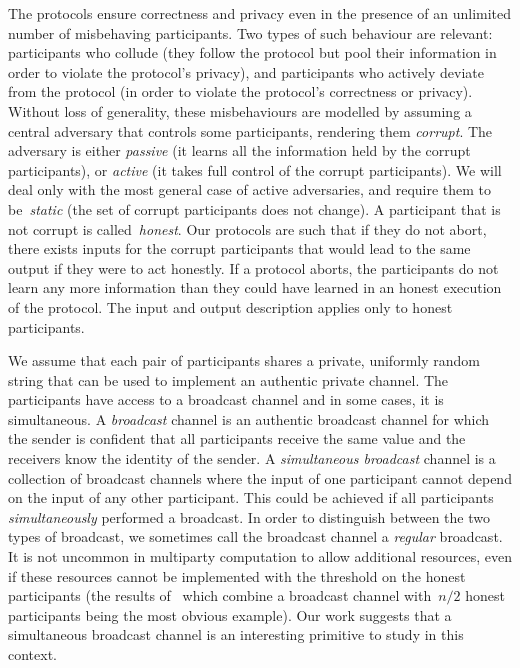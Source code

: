\documentclass[11pt]{article}
\begin{document}
The protocols ensure correctness and privacy even in the presence of
an unlimited number of misbehaving participants. Two types of such
behaviour are relevant: participants who collude (they follow the
protocol but pool their information in order to violate the
protocol's privacy), and participants who actively deviate from the
protocol (in order to violate the protocol's correctness or
privacy). Without loss of generality, these misbehaviours are
modelled by assuming a central adversary that controls  some
participants, rendering them \emph{corrupt}. The adversary is either
\emph{passive} (it learns all the information held by the corrupt
participants), or \emph{active} (it takes full control of the
corrupt participants). We will deal only with the most general case
of active adversaries, and require them to be~\emph{static} (the set
of corrupt participants does not change). A participant that is not
corrupt is called~\emph{honest}. Our protocols are such that if they
do not abort, there exists inputs for the corrupt participants that
would  lead to the same output if they were to act honestly. If a
protocol aborts, the participants do not learn any more information
than they could have learned in an honest execution of the protocol.
The input and output description applies  only to honest
participants.

We assume that each pair of participants shares a
private, uniformly random string that can be used to implement an
authentic private channel. The participants have access to a
broadcast channel and in some cases, it is simultaneous. A
\emph{broadcast} channel is an authentic broadcast channel for which
the sender is confident that all participants receive the same value
and the receivers know the identity of the sender. A
\emph{simultaneous broadcast} channel is a collection of broadcast
channels where the input of one participant cannot depend on the
input of any other participant. This could be achieved if all
participants {\em simultaneously} performed a broadcast. In order to
distinguish between the two types of broadcast, we sometimes call
the broadcast channel a \emph{regular} broadcast.
It is not
uncommon in multiparty computation to allow additional resources,
even if these resources cannot be implemented with the threshold on
the honest participants (the results of~\cite{RB89} which combine a
broadcast channel with~$n/2$ honest participants being the most
obvious example). Our work suggests that a simultaneous broadcast
channel is an interesting primitive to study in this context.
\end{document}
